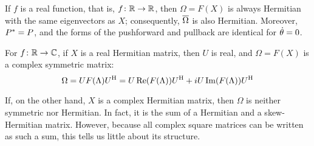 \documentclass[../../main.tex]{subfiles}
\begin{document}
\begin{refsection}
	If $f$ is a real function, that is, $f \colon \mathbb{R} \to \mathbb{R}$, then $\Omega = F(X)$ is always Hermitian with the same eigenvectors as $X$; consequently, $\overline{\Omega}$ is also Hermitian.
	Moreover, ${P}^* = P$, and the forms of the pushforward and pullback are identical for $\dot{\theta}=0$.

	For $f \colon \mathbb{R} \to \mathbb{C}$, if $X$ is a real Hermitian matrix, then $U$ is real, and $\Omega = F(X)$ is a complex symmetric matrix:
	$$\Omega = U F(\Lambda) {U}^\mathrm{H} = U \Re(F(\Lambda)) {U}^\mathrm{H} + i U \Im(F(\Lambda)) {U}^\mathrm{H}$$

	If, on the other hand, $X$ is a complex Hermitian matrix, then $\Omega$ is neither symmetric nor Hermitian.
	In fact, it is the sum of a Hermitian and a skew-Hermitian matrix.
	However, because all complex square matrices can be written as such a sum, this tells us little about its structure.

	\clearpage
	\printbibliography[heading=subbibintoc]
\end{refsection}
\end{document}
